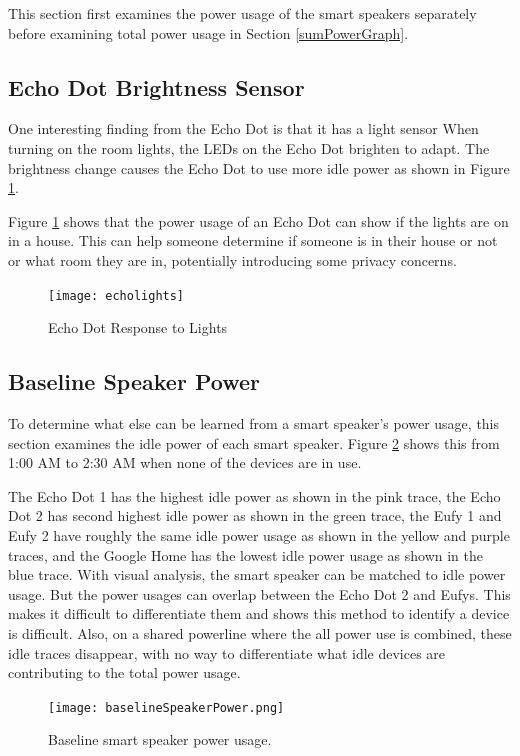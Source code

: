 This section first examines the power usage of the smart speakers separately before examining total power usage in Section \ref{sumPowerGraph}.

\subsection{Echo Dot Brightness Sensor}
\label{Echo Dot Brightness Sensor}
One interesting finding from the Echo Dot is that it has a light sensor When turning on the room lights, the LEDs on the Echo Dot brighten to adapt. The brightness change causes the Echo Dot to use more idle power as shown in Figure \ref{fig:echolights}.

Figure \ref{fig:echolights} shows that the power usage of an Echo Dot can show if the lights are on in a house. This can help someone determine if someone is in their house or not or what room they are in, potentially introducing some privacy concerns.

\begin{figure}[H]
    \centering
    \texttt{[image: echolights]}
    \caption{Echo Dot Response to Lights}
    \label{fig:echolights}
\end{figure}

\subsection{Baseline Speaker Power}
\label{Baseline Speaker Power}
To determine what else can be learned from a smart speaker's power usage, this section examines the idle power of each smart speaker. Figure \ref{fig:baselineSpeakerPower} shows this from 1:00 AM to 2:30 AM when none of the devices are in use.

The Echo Dot 1 has the highest idle power as shown in the pink trace, the Echo Dot 2 has second highest idle power as shown in the green trace, the Eufy 1 and Eufy 2 have roughly the same idle power usage as shown in the yellow and purple traces, and the Google Home has the lowest idle power usage as shown in the blue trace. With visual analysis, the smart speaker can be matched to idle power usage. But the power usages can overlap between the Echo Dot 2 and Eufys. This makes it difficult to differentiate them and shows this method to identify a device is difficult. Also, on a shared powerline where the all power use is combined, these idle traces disappear, with no way to differentiate what idle devices are contributing to the total power usage.

\begin{figure}[H]
    \centering
    \texttt{[image: baselineSpeakerPower.png]}
    \caption{Baseline smart speaker power usage.}
    \label{fig:baselineSpeakerPower}
\end{figure}

